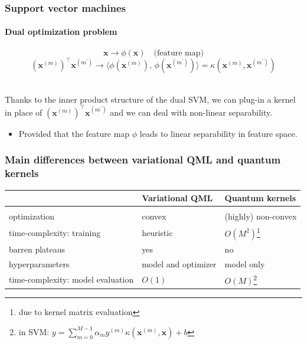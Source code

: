 \documentclass[aspectratio=43]{beamer}
\renewcommand{\cite}[1]{\footnote<.->[frame]{\fullcite{#1}}}
\newcommand{\inner}[2]{\langle #1,\, #2\rangle}
\newcommand{\kernel}[2]{\kappa\left( #1, #2 \right)}
\begin{document}
\begin{frame}
  \frametitle{Support vector machines}
  \framesubtitle{Dual optimization problem}
  
  \[\mathbf{x} \rightarrow \phi\left( \mathbf{x} \right) \quad \text{(feature map)}\]
  \pause
  \[\left( \mathbf{x}^{(m)} \right)^\top \mathbf{x}^{(m^\prime)} \rightarrow \inner{\phi\left( \mathbf{x}^{(m)} \right)}{\phi\left( \mathbf{x}^{(m^\prime)} \right)} = \kernel{\mathbf{x}^{(m)}}{\mathbf{x}^{(m^\prime)}}\]

  \ \\
  \pause
  Thanks to the inner product structure of the dual SVM, we can plug-in a kernel in place of $\left( \mathbf{x}^{(m)} \right)^\top \mathbf{x}^{(m^\prime)}$ and we can deal with non-linear separability.
  \begin{itemize}
    \item<4-> Provided that the feature map $\phi$ leads to linear separability in feature space.
  \end{itemize}
  

\end{frame}


\begin{frame}
  \frametitle{Main differences between variational QML and quantum kernels}

  \small
  \begin{table}[htbp]
    \centering\begin{tabular}{lll}
      & Variational QML & Quantum kernels \\
      \hline \\
      optimization & convex & (highly) non-convex \\
      time-complexity: training & heuristic & $O(M^2)$\footnote{due to kernel matrix evaluation} \\
      barren plateaus & yes & no \\
      hyperparameters & model and optimizer & model only \\
      time-complexity: model evaluation & $O(1)$ & $O(M)$\footnote{in SVM: $y = \sum_{m=0}^{M-1}\alpha_m y^{(m)} \kernel{\mathbf{x}^{(m)}}{\mathbf{x}} + b$}\\
      \hline
    \end{tabular}
  \end{table}

\end{frame}


\end{document}

